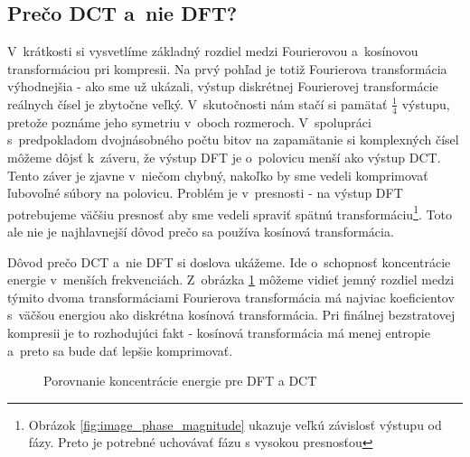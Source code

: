 \subsection{Prečo DCT a~nie DFT?}
 V~krátkosti si vysvetlíme základný rozdiel medzi Fourierovou 
 a~kosínovou transformáciou pri kompresii. Na prvý pohľad je totiž
 Fourierova transformácia výhodnejšia - ako sme už ukázali, výstup
 diskrétnej Fourierovej transformácie reálnych čísel je zbytočne
 veľký. V~skutočnosti nám stačí si pamätať $\frac{1}{4}$ výstupu, pretože
 poznáme jeho symetriu v~oboch rozmeroch. V~spolupráci s~predpokladom
 dvojnásobného počtu bitov na zapamätanie si komplexných čísel môžeme
 dôjsť k~záveru, že výstup DFT je o~polovicu menší ako výstup DCT.
 Tento záver je zjavne v~niečom chybný, nakoľko by sme vedeli
 komprimovať ľubovoľné súbory na polovicu. Problém je v~presnosti -
 na výstup DFT potrebujeme väčšiu presnosť aby sme vedeli spraviť
 spätnú transformáciu\footnote{Obrázok \ref{fig:image_phase_magnitude}
 ukazuje veľkú závislosť výstupu od fázy. Preto je potrebné uchovávať
 fázu s vysokou presnosťou}. Toto ale nie je najhlavnejší dôvod prečo sa
 používa kosínová transformácia.

 Dôvod  prečo DCT a~nie DFT si doslova ukážeme.
 Ide o~schopnosť koncentrácie energie
 v~menších frekvenciách. Z~obrázka \ref{fig:dct_vs_dft}
 môžeme vidieť jemný rozdiel medzi týmito dvoma transformáciami
 Fourierova transformácia má najviac koeficientov s~väčšou energiou
 ako diskrétna kosínová transformácia. Pri finálnej
 bezstratovej kompresii je to rozhodujúci fakt - kosínová
 transformácia má menej entropie a~preto sa bude dať lepšie
 komprimovať.
\begin{figure}[htp]
    \centering

    \caption{Porovnanie koncentrácie energie pre DFT a DCT}
    \label{fig:dct_vs_dft}
\end{figure}



